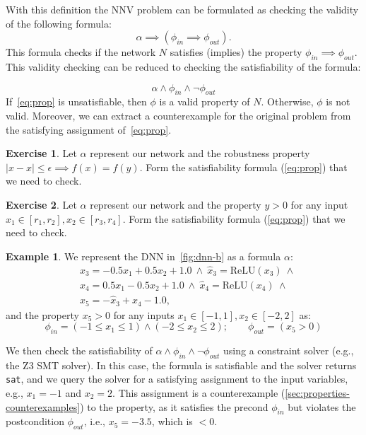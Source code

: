 \documentclass[oneside,11pt,dvipsnames]{book}
\numberwithin{equation}{section}
\theoremstyle{definition}
\newtheorem{example}{Example}[section]
\newtheorem{exercise}{Exercise}[section]
\theoremstyle{remark}
\newcommand{\relu}[1]{\mathrm{ReLU}\left(#1\right)}
\newcommand{\sat}{\texttt{sat}}
\begin{document}
With this definition the NNV problem can be formulated as checking the validity of the following formula:
\begin{equation}\label{eq:nnv}
    \alpha \implies (\phi_{in} \implies \phi_{out}).
\end{equation}
This formula checks if the network $N$ satisfies (implies) the property $\phi_{in} \implies \phi_{out}$. This validity checking can be reduced to checking the satisfiability of the formula:

\begin{equation}\label{eq:prop}
  \alpha \land \phi_{in} \land \neg \phi_{out}
\end{equation}
If~\autoref{eq:prop} is unsatisfiable, then $\phi$ is a valid property of $N$. Otherwise, $\phi$ is not valid.  Moreover, we can extract a counterexample for the original problem from the satisfying assignment of~\autoref{eq:prop}.

\begin{exercise}\label{ex:prop-neg1}
  Let $\alpha$ represent our network and the robustness property $| x - x | \le \epsilon \implies  f(x) = f(y)$. Form the satisfiability formula (\autoref{eq:prop}) that we need to check.
\end{exercise}


\begin{exercise}\label{ex:prop-neg2}
  Let $\alpha$ represent our network and the property $y>0$ for any input $x_1 \in [r_1,r_2], x_2 \in [r_3,r_4]$. Form the satisfiability formula (\autoref{eq:prop}) that we need to check.
\end{exercise}

\begin{example}\label{ex:dnn-sat}
We represent the DNN in~\autoref{fig:dnn-b} as a formula $\alpha$:
\begin{align*}
& x_3 = -0.5x_1 + 0.5x_2 + 1.0 ~\land~ \hat{x}_3 = \relu{x_3} ~\land \\
& x_4 = 0.5x_1 - 0.5x_2 + 1.0  ~\land~ \hat{x}_4 = \relu{x_4} ~\land \\
& x_5 = -\hat{x}_3 + \hat{x}_4 - 1.0,
\end{align*}
\noindent and the property $x_5 > 0$ for any inputs $x_1 \in [-1,1], x_2\in[-2,2]$ as:
\begin{equation*}
\phi_{in} = (-1 \le x_1 \le 1) \land (-2 \le x_2 \le 2); \qquad
\phi_{out} = (x_5 > 0)
\end{equation*}

We then check the satisfiability of $\alpha \land \phi_{in} \land \neg \phi_{out}$ using a constraint solver (e.g., the Z3 SMT solver).  In this case, the formula is satisfiable and the solver returns \sat{}, and we query the solver for a satisfying assignment to the input variables, e.g., $x_1=-1$ and $x_2=2$. This assignment is a counterexample (\autoref{sec:properties-counterexamples}) to the property, as it satisfies the precond $\phi_{in}$ but violates the postcondition $\phi_{out}$, i.e., $x_5 = -3.5$, which is  $< 0$.

\end{example}
\end{document}

